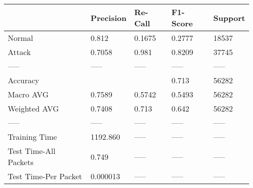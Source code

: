 \begin{tabular}{lllll}
\toprule
{} & Precision & Re-Call & F1-Score & Support \\
\midrule
Normal                &     0.812 &  0.1675 &   0.2777 &   18537 \\
Attack                &    0.7058 &   0.981 &   0.8209 &   37745 \\
-----                 &     ----- &   ----- &    ----- &   ----- \\
Accuracy              &           &         &    0.713 &   56282 \\
Macro AVG             &    0.7589 &  0.5742 &   0.5493 &   56282 \\
Weighted AVG          &    0.7408 &   0.713 &    0.642 &   56282 \\
-----                 &     ----- &   ----- &    ----- &   ----- \\
Training Time         &  1192.860 &   ----- &    ----- &   ----- \\
Test Time-All Packets &     0.749 &   ----- &    ----- &   ----- \\
Test Time-Per Packet  &  0.000013 &   ----- &    ----- &   ----- \\
\bottomrule
\end{tabular}
